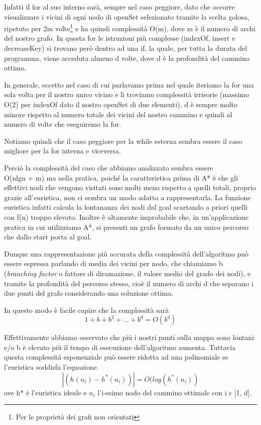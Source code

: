 \documentclass[12pt,a4paper]{report}
\begin{document}
Infatti il for al suo interno sarà, sempre nel caso peggiore, dato che occorre visualizzare i vicini di ogni nodo di openSet selezionato tramite la scelta golosa, ripetuto per 2m volte\footnote[2]{Per le proprietà dei grafi non orientati} e ha quindi complessità O(m), dove m è il numero di archi del nostro grafo.
In questa for le istruzioni più complesse (indexOf, insert e decreaseKey) si trovano però dentro ad una if, la quale, per tutta la durata del programma, viene acceduta almeno d volte, dove d è la profondità del cammino ottimo.


In generale, eccetto nel caso di cui parlavamo prima nel quale iteriamo la for una sola volta per il nostro unico vicino e lì troviamo complessità irrisorie (massimo O(2) per indexOf dato il nostro openSet di due elementi), d è sempre molto minore rispetto al numero totale dei vicini del nostro cammino e quindi al numero di volte che eseguiremo la for.

Notiamo quindi che il caso peggiore per la while esterna sembra essere il caso migliore per la for interna e viceversa.


Perciò la complessità del caso che abbiamo analizzato sembra essere \\ O(nlgn + m) ma nella pratica, poiché la caratteristica prima di A* è che gli effettivi nodi che vengono visitati sono molti meno rispetto a quelli totali, proprio grazie all'euristica, non ci sembra un modo adatto a rappresentarla.
La funzione euristica infatti calcola la lontananza dei nodi dal goal scartando a priori quelli con f(n) troppo elevato.
Inoltre è altamente improbabile che, in un'applicazione pratica in cui utilizziamo A*, si presenti un grafo formato da un unico percorso che dallo start porta al goal.

Dunque una rappresentazione più accurata della complessità dell'algoritmo può essere espressa parlando di media dei vicini per nodo, che chiamiamo b (\emph{branching factor} o fattore di diramazione, il valore medio del grado dei nodi), e tramite la profondità del percorso stesso, cioè il numero di archi d che separano i due punti del grafo considerando una soluzione ottima.

In questo modo è facile capire che la complessità sarà \[1+b+b^2+...+b^d = O(b^{d})\]


Effettivamente abbiamo osservato che più i nostri punti sulla mappa sono lontani e/o b è elevato più il tempo di esecuzione dell'algoritmo aumenta.
Tuttavia questa complessità esponenziale può essere ridotta ad una polinomiale se l'euristica soddisfa l'equazione \[|(h(n_i)-h^*(n_i))| = O(log(h^*(n_i))\]
ove h* è l'euristica ideale e \(n_i\) l'i-esimo nodo del cammino ottimale con i \(\epsilon\) [1, d].
\\
\end{document}
